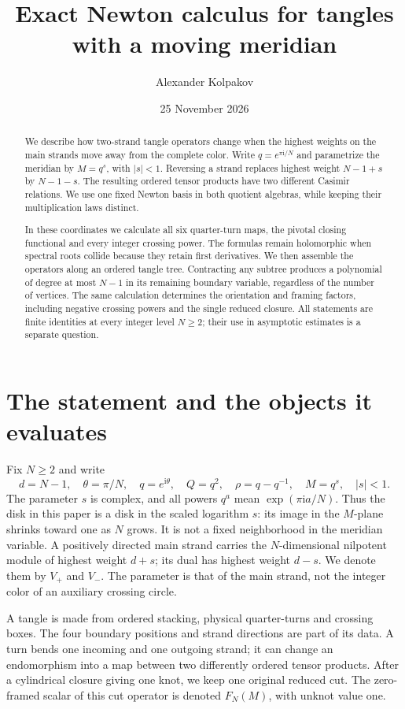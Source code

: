 \documentclass[11pt]{article}
\title{Exact Newton calculus for tangles with a moving meridian}
\author{Alexander Kolpakov}\date{25 November 2026}
\numberwithin{equation}{section}
\theoremstyle{definition}\newtheorem{definition}[theorem]{Definition}
\theoremstyle{remark}\newtheorem{remark}[theorem]{Remark}
\newcommand{\ii}{\mathrm i}
\begin{document}
\maketitle
\begin{abstract}
We describe how two-strand tangle operators change when the highest
weights on the main strands move away from the complete color. Write
$q=e^{\pi\ii/N}$ and parametrize the meridian by $M=q^s$, with
$|s|<1$. Reversing a strand replaces highest weight $N-1+s$ by
$N-1-s$. The resulting ordered tensor products have two different
Casimir relations. We use one fixed Newton basis in both quotient
algebras, while keeping their multiplication laws distinct.

In these coordinates we calculate all six quarter-turn maps, the
pivotal closing functional and every integer crossing power. The
formulas remain holomorphic when spectral roots collide because they
retain first derivatives. We then assemble the operators along an
ordered tangle tree. Contracting any subtree produces a polynomial of
degree at most $N-1$ in its remaining boundary variable, regardless
of the number of vertices. The same calculation determines the
orientation and framing factors, including negative crossing powers
and the single reduced closure. All statements are finite identities
at every integer level $N\ge2$; their use in asymptotic estimates is a
separate question.
\end{abstract}

\section{The statement and the objects it evaluates}
Fix $N\ge2$ and write
\[
 d=N-1,\quad \theta=\pi/N,\quad q=e^{\ii\theta},\quad Q=q^2,
 \quad \rho=q-q^{-1},\quad M=q^s,\quad |s|<1.
\]
The parameter $s$ is complex, and all powers $q^a$ mean
$\exp(\pi\ii a/N)$. Thus the disk in this paper is a disk in the
scaled logarithm $s$: its image in the $M$-plane shrinks toward one
as $N$ grows. It is not a fixed neighborhood in the meridian variable.
A positively directed main
strand carries the $N$-dimensional nilpotent module of highest weight
$d+s$; its dual has highest weight $d-s$. We denote them by $V_+$
and $V_-$. The parameter is that of the main strand, not the integer
color of an auxiliary crossing circle.

A tangle is made from ordered stacking, physical quarter-turns and
crossing boxes. The four boundary positions and strand directions are
part of its data. A turn bends one incoming and one outgoing strand;
it can change an endomorphism into a map between two differently
ordered tensor products. After a cylindrical closure giving one knot,
we keep one original reduced cut. The zero-framed scalar of this cut
operator is denoted $F_N(M)$, with unknot value one.
\end{document}
